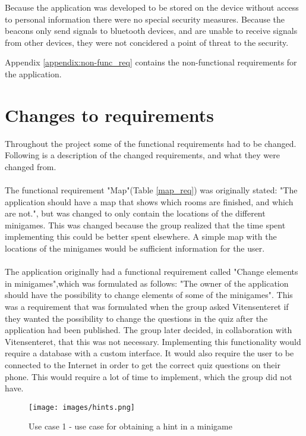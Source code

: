 Because the application was developed to be stored on the device without access to personal information there were no special security measures. Because the beacons only send signals to bluetooth devices, and are unable to receive signals from other devices, they were not concidered a point of threat to the security.

Appendix \ref{appendix:non-func_req} contains the non-functional requirements for the application.

\section{Changes to requirements}

Throughout the project some of the functional requirements had to be changed. Following is a description of the changed requirements, and what they were changed from.\\
\\
The functional requirement "Map"(Table \ref{map_req}) was originally stated: "The application should have a map that shows which rooms are finished, and which are not.", but was changed to only contain the locations of the different minigames. This was changed because the group realized that the time spent implementing this could be better spent elsewhere. A simple map with the locations of the minigames would be sufficient information for the user.\\
\\
The application originally had a functional requirement called "Change elements in minigames",which was formulated as follows: "The owner of the application should have the possibility to change elements of some of the minigames". This was a requirement that was formulated when the group asked Vitensenteret if they wanted the possibility to change the questions in the quiz after the application had been published. The group later decided, in collaboration with Vitensenteret, that this was not necessary. Implementing this functionality would require a database with a custom interface. It would also require the user to be connected to the Internet in order to get the correct quiz questions on their phone. This would require a lot of time to implement, which the group did not have.




\begin{figure}[!h]
    \centering
    \texttt{[image: images/hints.png]}
    \caption{Use case 1 - use case for obtaining a hint in a minigame}
    \label{fig:use case 1}
\end{figure}

